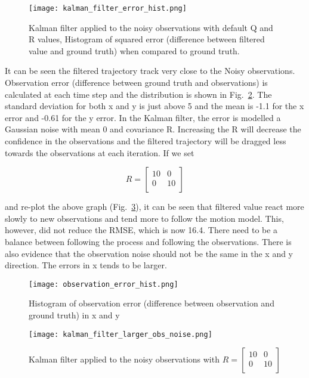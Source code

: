 \documentclass{report}
\begin{document}
\begin{figure}
    \centering
    \texttt{[image: kalman\_filter\_error\_hist.png]}
    \caption{Kalman filter applied to the noisy observations with default Q and R values, Histogram of squared error (difference between filtered value and ground truth) when compared to ground truth.}
    \label{fig:kalman_filter_error_hist}
\end{figure}


It can be seen the filtered trajectory track very close to the Noisy observations. 
Observation error (difference between ground truth and observations) is calculated at each time step and the distribution is shown in Fig.~\ref{fig:observation_error_hist}. The standard deviation for both x and y is just above 5 and the mean is -1.1 for the x error and -0.61 for the y error. In the Kalman filter, the error is modelled a Gaussian noise with mean 0 and covariance R. Increasing the R will decrease the confidence in the observations and the filtered trajectory will be dragged less towards the observations at each iteration. If we set

\[R = \begin{bmatrix} 
    10 & 0 \\
    0 & 10 \\
\end{bmatrix}\]

and re-plot the above graph (Fig.~\ref{fig:kalman_filter_larger_obs_noise}), it can be seen that filtered value react more slowly to new observations and tend more to follow the motion model. This, however, did not reduce the RMSE, which is now 16.4. There need to be a balance between following the process and following the observations. There is also evidence that the observation noise should not be the same in the x and y direction. The errors in x tends to be larger.


\begin{figure}
    \centering
    \texttt{[image: observation\_error\_hist.png]}
    \caption{Histogram of observation error (difference between observation and ground truth) in x and y}
    \label{fig:observation_error_hist}
\end{figure}

\begin{figure}
    \centering
    \texttt{[image: kalman\_filter\_larger\_obs\_noise.png]}
    \caption{Kalman filter applied to the noisy observations with \(R = \begin{bmatrix} 
        10 & 0 \\
        0 & 10 \\
    \end{bmatrix}\)}
    \label{fig:kalman_filter_larger_obs_noise}
\end{figure}
\end{document}
